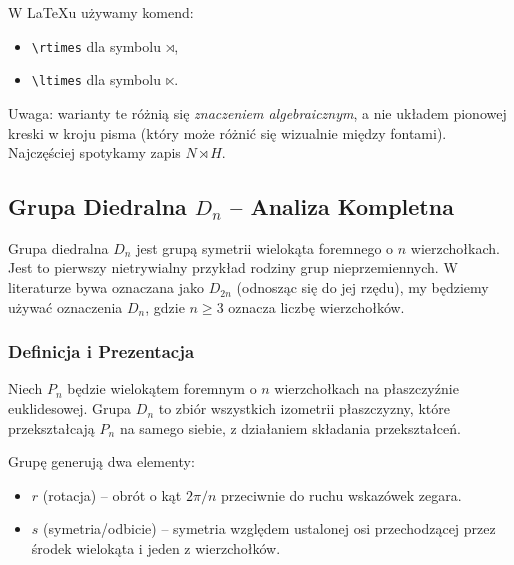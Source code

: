 \begin{remark}[LaTeX]
W \LaTeX u używamy komend:
\begin{itemize}
    \item \verb+\rtimes+ dla symbolu $\rtimes$,
    \item \verb+\ltimes+ dla symbolu $\ltimes$.
\end{itemize}

Uwaga: warianty te różnią się \emph{znaczeniem algebraicznym}, a nie układem
pionowej kreski w kroju pisma (który może różnić się wizualnie między fontami).
Najczęściej spotykamy zapis $N \rtimes H$.
\end{remark}


\subsection{Grupa Diedralna $D_n$ – Analiza Kompletna}

\begin{context}
Grupa diedralna $D_n$ jest grupą symetrii wielokąta foremnego o $n$ wierzchołkach. Jest to pierwszy nietrywialny przykład rodziny grup nieprzemiennych. W literaturze bywa oznaczana jako $D_{2n}$ (odnosząc się do jej rzędu), my będziemy używać oznaczenia $D_n$, gdzie $n \ge 3$ oznacza liczbę wierzchołków.
\end{context}

\subsubsection{Definicja i Prezentacja}

\begin{definition}[Geometryczna]
Niech $P_n$ będzie wielokątem foremnym o $n$ wierzchołkach na płaszczyźnie euklidesowej. Grupa $D_n$ to zbiór wszystkich izometrii płaszczyzny, które przekształcają $P_n$ na samego siebie, z działaniem składania przekształceń.
\end{definition}

\begin{fact}[Generatory]
Grupę generują dwa elementy:
\begin{itemize}
    \item $r$ (rotacja) – obrót o kąt $2\pi/n$ przeciwnie do ruchu wskazówek zegara.
    \item $s$ (symetria/odbicie) – symetria względem ustalonej osi przechodzącej przez środek wielokąta i jeden z wierzchołków.
\end{itemize}
\end{fact}

